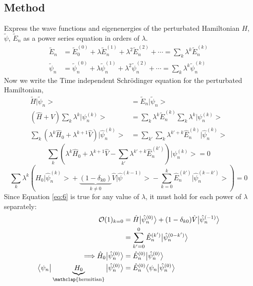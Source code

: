 \documentclass[12pt]{article}
\begin{document}
\subsection{Method}
Express the wave functions and eigenenergies of the perturbated Hamiltonian $H$, $\tilde{\psi}$, $\tilde{E}_n$ 
as a power series equation in orders of $\lambda$.
\begin{align*}
	\tilde{E}_n & = \tilde{E}^{(0)}_0 + \lambda \tilde{E}^{(1)}_n + \lambda^2 \tilde{E}^{(2)}_n
	+ \cdots = \sum_{k} \lambda^{k} \tilde{E}^{(k)}_n\\
	\tilde{\psi}_n & = \tilde{\psi}^{(0)}_n + \lambda \tilde{\psi}^{(1)}_n + \lambda^2 \tilde{\psi}^{(2)}_n 
	+ \cdots = \sum_{k} \lambda^k \tilde{\psi}^{(k)}_n
\end{align*}
Now we write the Time independent Schr\"odinger equation for the perturbated Hamiltonian,
\begin{align}
  \tilde{H} \big|\tilde{\psi}_n \big > & = \tilde{E}_n \big|\tilde{\psi}_n \big >\\
	(\hat{H} + \hat{V}) \sum_{k} \lambda^k \big| \psi^{(k)}_n \big > & = \sum_{k} \lambda^k \tilde{E}^{(k)}_n \sum_{k}
	\lambda^k \big|\psi^{(k)}_n \big>\\
	\sum_{k}(\lambda^k \hat{H}_0 + \lambda^{k+1} \hat{V}) \big|\hat{\psi}^{(k)}_n \big > & = \sum_{k'} \sum_{k}
	\lambda^{k'+k} \hat{E}^{(k)}_n \big| \hat{\psi}^{(k)}_n \big >
\end{align}
\begin{equation}
	\sum_{k} \left(\lambda^k \hat{H}_0 + \lambda^{k+1} \hat{V} - \sum_{k'} \lambda^{k'+ k}  
	\hat{E}^{(k')}_n \right ) \big|\psi^{(k)}_n \big > = 0 
\end{equation}
\begin{equation}
  \label{eq:6}
	\sum_{k} \lambda^{k} \left(\hat{H}_0 \big| \hat{\psi}^{(k)}_n \big > + \underbrace{(1 - \delta_
	{k0})}_{k\neq 0} \hat{V} \big| \hat{\psi}^{(k-1)} \big > - \sum_{k=0}^{k} \hat{E}^{(k')}_n 
	\big | \hat{\psi}^{(k-k')}_n \big > \right ) = 0
\end{equation}
Since Equation \ref{eq:6} is true for any value of $\lambda$, it must hold for each power of $\lambda$ separately:
\begin{align*}
	\mathcal{O}(1)_{k=0} & = \hat{H} \big | \hat{\psi}^{(0)}_n \big > + (1 - \delta_{k0}) \hat{V}
	\big | \hat{\psi}^{(-1)}_n \big >\\
	& = \sum_{k' = 0}^{0} \hat{E}^{(k')}_n \big| \hat{\psi}^{(0-k')}_n \big>\\
	\Longrightarrow \hat{H}_0 \big| \hat{\psi}^{(0)}_n \big > & = \hat{E}^{(0)}_n \big| \hat{\psi}^{(0)}_n \big>\\
  \big < \psi_n \big | \underbrace{H_0}_{\mathclap{\text{hermitian}}} \big| \hat{\psi}^{(0)}_n \big > & = \hat{E}^{(0)}_n \big < \psi_n   \big |
	\hat{\psi}^{(0)}_n\big>
\end{align*}
\end{document}
